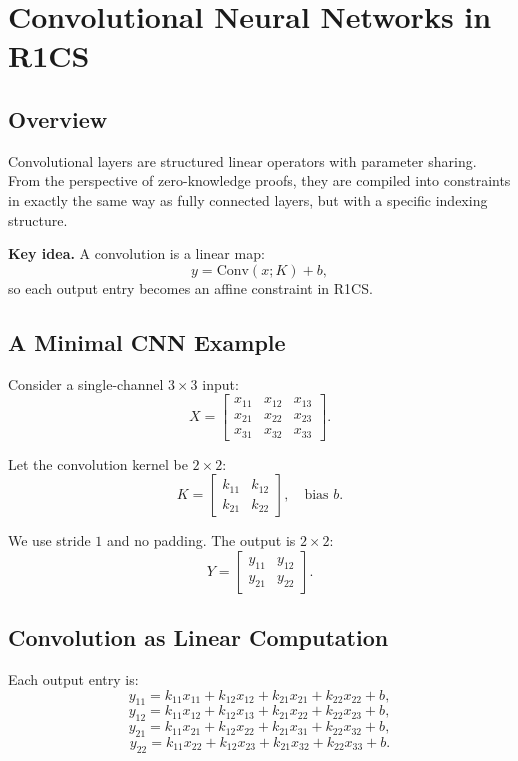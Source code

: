 \section{Convolutional Neural Networks in R1CS}

\subsection{Overview}

Convolutional layers are structured linear operators with parameter sharing.
From the perspective of zero-knowledge proofs, they are compiled into constraints
in exactly the same way as fully connected layers, but with a specific indexing structure.

\medskip

\noindent
\textbf{Key idea.}
A convolution is a linear map:
\[
y = \text{Conv}(x; K) + b,
\]
so each output entry becomes an affine constraint in R1CS.

\subsection{A Minimal CNN Example}

Consider a single-channel $3 \times 3$ input:
\[
X =
\begin{bmatrix}
x_{11} & x_{12} & x_{13} \\
x_{21} & x_{22} & x_{23} \\
x_{31} & x_{32} & x_{33}
\end{bmatrix}.
\]

Let the convolution kernel be $2 \times 2$:
\[
K =
\begin{bmatrix}
k_{11} & k_{12} \\
k_{21} & k_{22}
\end{bmatrix},
\quad \text{bias } b.
\]

We use stride $1$ and no padding. The output is $2 \times 2$:
\[
Y =
\begin{bmatrix}
y_{11} & y_{12} \\
y_{21} & y_{22}
\end{bmatrix}.
\]

\subsection{Convolution as Linear Computation}

Each output entry is:
\[
y_{11} = k_{11}x_{11} + k_{12}x_{12} + k_{21}x_{21} + k_{22}x_{22} + b,
\]
\[
y_{12} = k_{11}x_{12} + k_{12}x_{13} + k_{21}x_{22} + k_{22}x_{23} + b,
\]
\[
y_{21} = k_{11}x_{21} + k_{12}x_{22} + k_{21}x_{31} + k_{22}x_{32} + b,
\]
\[
y_{22} = k_{11}x_{22} + k_{12}x_{23} + k_{21}x_{32} + k_{22}x_{33} + b.
\]

